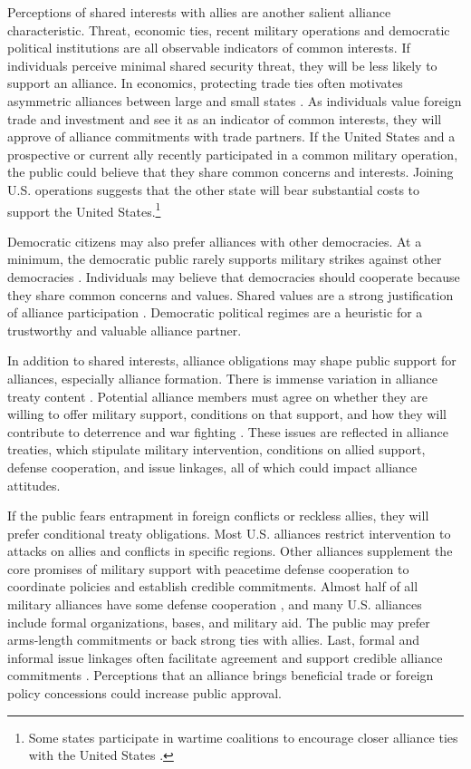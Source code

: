 \documentclass[12pt]{article}
\begin{document}
Perceptions of shared interests with allies are another salient alliance characteristic. 
Threat, economic ties, recent military operations and democratic political institutions are all observable indicators of common interests. 
If individuals perceive minimal shared security threat, they will be less likely to support an alliance.
In economics, protecting trade ties often motivates asymmetric alliances between large and small states \citep{Fordham2010}. 
As individuals value foreign trade and investment and see it as an indicator of common interests, they will approve of alliance commitments with trade partners. 
If the United States and a prospective or current ally recently participated in a common military operation, the public could believe that they share common concerns and interests. 
Joining U.S. operations suggests that the other state will bear substantial costs to support the United States.\footnote{Some states participate in wartime coalitions to encourage closer alliance ties with the United States \citep{GannonKent2020}.}


Democratic citizens may also prefer alliances with other democracies. 
At a minimum, the democratic public rarely supports military strikes against other democracies \citep{TomzWeeks2013}. 
Individuals may believe that democracies should cooperate because they share common concerns and values. 
Shared values are a strong justification of alliance participation \citep{Chuetal2021}. 
Democratic political regimes are a heuristic for a trustworthy and valuable alliance partner. 


In addition to shared interests, alliance obligations may shape public support for alliances, especially alliance formation. 
There is immense variation in alliance treaty content \citep{Leedsetal2002}.
Potential alliance members must agree on whether they are willing to offer military support, conditions on that support, and how they will contribute to deterrence and war fighting \citep{Poast2019a}. 
These issues are reflected in alliance treaties, which stipulate military intervention, conditions on allied support, defense cooperation, and issue linkages, all of which could impact alliance attitudes. 


If the public fears entrapment in foreign conflicts or reckless allies, they will prefer conditional treaty obligations.
Most U.S. alliances restrict intervention to attacks on allies and conflicts in specific regions. 
Other alliances supplement the core promises of military support with peacetime defense cooperation \citep{Morrow1994, LeedsAnac2005} to coordinate policies and establish credible commitments.
Almost half of all military alliances have some defense cooperation \citep{Leedsetal2002}, and many U.S. alliances include formal organizations, bases, and military aid. 
The public may prefer arms-length commitments or back strong ties with allies. 
Last, formal and informal issue linkages often facilitate agreement and support credible alliance commitments \citep{Poast2012, Poast2013}. 
Perceptions that an alliance brings beneficial trade or foreign policy concessions could increase public approval.  
\end{document}
